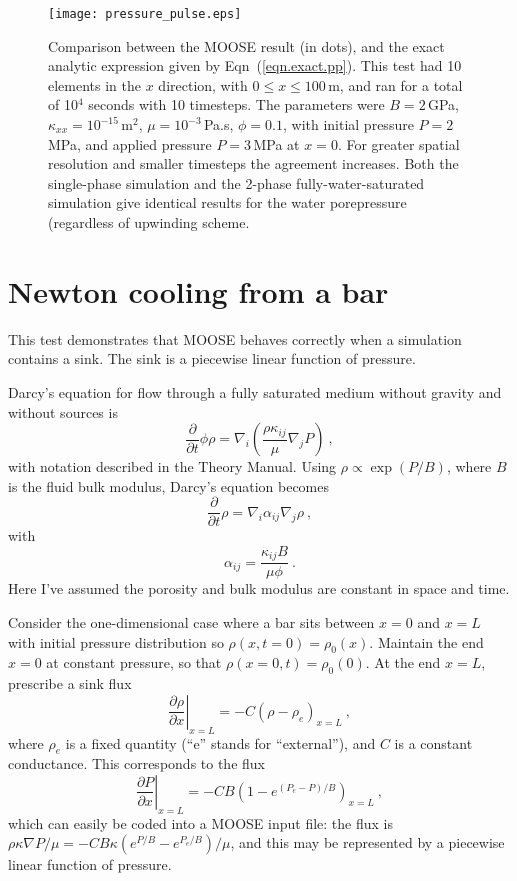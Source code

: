 \documentclass[]{scrreprt}
\begin{document}
\begin{figure}[htb]
\centering
\texttt{[image: pressure\_pulse.eps]}
\caption{Comparison between the MOOSE result (in dots), and the
  exact analytic expression given by Eqn~(\ref{eqn.exact.pp}).  This
  test had 10 elements in the $x$ direction, with $0\leq x \leq
  100$\,m, and ran for a total of 
  10$^4$ seconds with 10 timesteps.  The parameters were $B=2$\,GPa,
  $\kappa_{xx}=10^{-15}$\,m$^{2}$, $\mu=10^{-3}$\,Pa.s, $\phi=0.1$,
  with initial pressure $P=2$\,MPa, and applied pressure $P=3$\,MPa at
  $x=0$.  For greater spatial resolution and smaller timesteps the
  agreement increases.  Both the single-phase simulation and the
  2-phase fully-water-saturated simulation give identical results for
  the water porepressure (regardless of upwinding scheme.}
\label{pressure_pulse.fig}
\end{figure}



\chapter{Newton cooling from a bar}
\label{nc}

This test demonstrates that MOOSE behaves correctly when a simulation
contains a sink.  The sink is a piecewise linear function of pressure.

Darcy's equation for flow through a fully saturated medium without
gravity and without sources is 
\begin{equation}
\frac{\partial}{\partial t}\phi\rho = \nabla_{i}\left(\frac{\rho
  \kappa_{ij}}{\mu} \nabla_{j}P \right) \ ,
\end{equation}
with notation described in the Theory Manual.  Using $\rho \propto
\exp(P/B)$, where $B$ is the fluid bulk modulus, Darcy's equation
becomes
\begin{equation}
\frac{\partial}{\partial t}\rho = \nabla_{i}\alpha_{ij}\nabla_{j}\rho \ ,
\end{equation}
with 
\begin{equation}
\alpha_{ij} = \frac{\kappa_{ij}B}{\mu\phi} \ .
\end{equation}
Here I've assumed the porosity and bulk modulus are constant in space
and time.

Consider the one-dimensional case where a bar sits between $x=0$ and
$x=L$ with initial pressure distribution so $\rho(x,t=0) = \rho_{0}(x)$.
Maintain the end $x=0$ at constant pressure, so that $\rho(x=0, t) =
\rho_{0}(0)$.  At the end $x=L$, prescribe a sink flux
\begin{equation}
\left.\frac{\partial\rho}{\partial x}\right|_{x=L} = -C\left(\rho -
\rho_{e}\right)_{x=L} \ ,
\end{equation}
where $\rho_{e}$ is a fixed quantity (``e'' stands for ``external''),
and $C$ is a constant conductance.  This corresponds to the flux
\begin{equation}
\left.\frac{\partial P}{\partial x}\right|_{x=L} = -CB\left(1 -
e^{(P_{e}-P)/B}\right)_{x=L} \ ,
\end{equation}
which can easily be coded into a MOOSE input file: the flux is
$\rho\kappa\nabla P/\mu = -CB\kappa(e^{P/B} - e^{P_{e}/B})/\mu$, and
this may be represented by a piecewise linear function of pressure.
\end{document}

